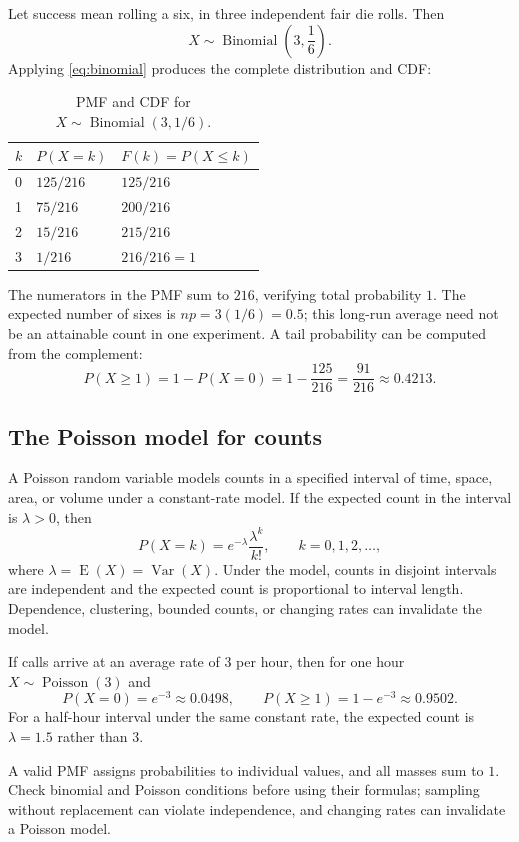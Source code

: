 \documentclass[11pt]{article}
\newcommand{\E}{\operatorname{E}}
\newcommand{\Var}{\operatorname{Var}}
\begin{document}
Let success mean rolling a six, in three independent fair die rolls.  Then
\[
X\sim\operatorname{Binomial}\left(3,\frac16\right).
\]
Applying \eqref{eq:binomial} produces the complete distribution and CDF:

\begin{table}[ht]
\centering
\caption{PMF and CDF for $X\sim\operatorname{Binomial}(3,1/6)$.}\label{tab:binomial-cdf}
\begin{tabularx}{0.75\textwidth}{@{}lYY@{}}
\toprule
$k$ & $P(X=k)$ & $F(k)=P(X\le k)$ \\
 & $125/216$ & $125/216$ \\
1 & $75/216$ & $200/216$ \\
2 & $15/216$ & $215/216$ \\
3 & $1/216$ & $216/216=1$ \\
\bottomrule
\end{tabularx}
\end{table}

The numerators in the PMF sum to $216$, verifying total probability $1$.
The expected number of sixes is $np=3(1/6)=0.5$; this long-run average need
not be an attainable count in one experiment.  A tail probability can be
computed from the complement:
\[
P(X\ge1)=1-P(X=0)=1-\frac{125}{216}=\frac{91}{216}\approx0.4213.
\]

\subsection{The Poisson model for counts}
A Poisson random variable models counts in a specified interval of time,
space, area, or volume under a constant-rate model.  If the expected count in
the interval is $\lambda>0$, then
\begin{equation}\label{eq:poisson}
P(X=k)=e^{-\lambda}\frac{\lambda^k}{k!},\qquad k=0,1,2,\ldots,
\end{equation}
where $\lambda=\E(X)=\Var(X)$.  Under the model, counts in disjoint intervals
are independent and the expected count is proportional to interval length.
Dependence, clustering, bounded counts, or changing rates can invalidate the
model.

If calls arrive at an average rate of $3$ per hour, then for one hour
$X\sim\operatorname{Poisson}(3)$ and
\[
P(X=0)=e^{-3}\approx0.0498,
\qquad
P(X\ge1)=1-e^{-3}\approx0.9502.
\]
For a half-hour interval under the same constant rate, the expected count is
$\lambda=1.5$ rather than $3$.

\begin{keybox}
A valid PMF assigns probabilities to individual values, and all masses sum
to $1$.  Check binomial and Poisson conditions before using their formulas;
sampling without replacement can violate independence, and changing rates can
invalidate a Poisson model.
\end{keybox}
\end{document}
